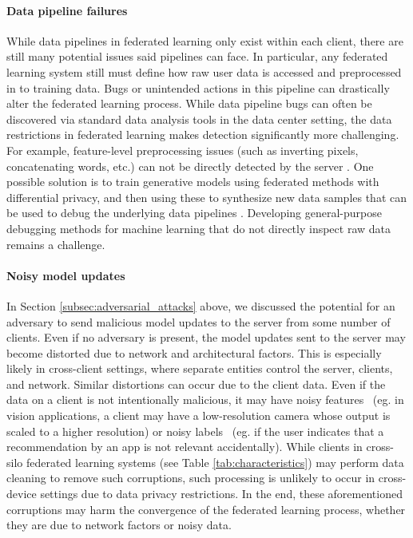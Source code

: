 \documentclass[11pt]{article}
\begin{document}
\paragraph{Data pipeline failures}\label{p:pipeline-failures}
While data pipelines in federated learning only exist within each client, there are still many potential issues said pipelines can face. In particular, any federated learning system still must define how raw user data is accessed and preprocessed in to training data. Bugs or unintended actions in this pipeline can drastically alter the federated learning process. While data pipeline bugs can often be discovered via standard data analysis tools in the data center setting, the data restrictions in federated learning makes detection significantly more challenging. For example, feature-level preprocessing issues (such as inverting pixels, concatenating words, etc.) can not be directly detected by the server \citep{augenstein2019generative}. One possible solution is to train generative models using federated methods with differential privacy, and then using these to synthesize new data samples that can be used to debug the underlying data pipelines \citep{augenstein2019generative}. Developing general-purpose debugging methods for machine learning that do not directly inspect raw data remains a challenge.

\paragraph{Noisy model updates}\label{p:noisy-model-updates}
In Section \ref{subsec:adversarial_attacks} above, we discussed the potential for an adversary to send malicious model updates to the server from some number of clients. Even if no adversary is present, the model updates sent to the server may become distorted due to network and architectural factors. This is especially likely in cross-client settings, where separate entities control the server, clients, and network. Similar distortions can occur due to the client data. Even if the data on a client is not intentionally malicious, it may have noisy features~\citep{mnih2012learning} (eg. in vision applications, a client may have a low-resolution camera whose output is scaled to a higher resolution) or noisy labels~\citep{natarajan2013learning} (eg. if the user indicates that a recommendation by an app is not relevant accidentally). While clients in cross-silo federated learning systems (see Table \ref{tab:characteristics}) may perform data cleaning to remove such corruptions, such processing is unlikely to occur in cross-device settings due to data privacy restrictions. In the end, these aforementioned corruptions may harm the convergence of the federated learning process, whether they are due to network factors or noisy data.
\end{document}
